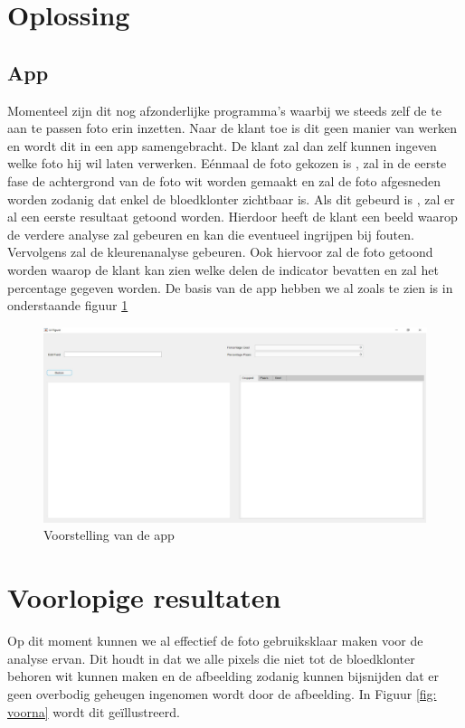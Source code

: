 \documentclass[a4paper,kulak]{kulakarticle}
\begin{document}
	\section{Oplossing} 

		\subsection{App}
		Momenteel zijn dit nog afzonderlijke programma's waarbij we steeds zelf de te aan te passen foto erin inzetten. Naar de klant toe is dit geen manier van werken en wordt dit in een app samengebracht. De klant zal dan zelf kunnen ingeven welke foto hij wil laten verwerken. Eénmaal de foto gekozen is , zal in de eerste fase de achtergrond van de foto wit worden gemaakt en zal de foto afgesneden worden zodanig dat enkel de bloedklonter zichtbaar is. Als dit gebeurd is , zal er al een eerste resultaat getoond worden. Hierdoor heeft de klant een beeld waarop de verdere analyse zal gebeuren en kan die eventueel ingrijpen bij fouten. Vervolgens zal de kleurenanalyse gebeuren. Ook hiervoor zal de foto getoond worden waarop de klant kan zien welke delen de indicator bevatten en zal het percentage gegeven worden. De basis van de app hebben we al zoals te zien is in onderstaande figuur \ref{fig: app}
	
		\begin{figure}[H]
			\centering
			\includegraphics[width=170mm]{app.jpg}
			\caption{Voorstelling van de app}
			\label{fig: app}
		\end{figure}
	
		
	

	\section{Voorlopige resultaten}		
		Op dit moment kunnen we al effectief de foto gebruiksklaar maken voor de analyse ervan. Dit houdt in dat we alle pixels die niet tot de bloedklonter behoren wit kunnen maken en de afbeelding zodanig kunnen bijsnijden dat er geen overbodig geheugen ingenomen wordt door de afbeelding. In Figuur \ref{fig: voorna} wordt dit geïllustreerd.
	
\end{document}
